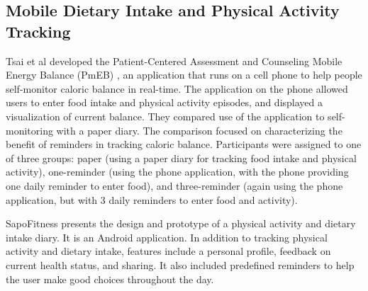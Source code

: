 \subsection{Mobile Dietary Intake and Physical Activity Tracking}
Tsai et al developed the Patient-Centered Assessment and Counseling Mobile Energy Balance (PmEB) \citep{tsai_usability_2007},  an application that runs on a cell phone to help people self-monitor caloric balance in real-time.  The application on the phone allowed users to enter food intake and physical activity episodes, and displayed a visualization of current balance. They compared use of the application to self-monitoring with a paper diary. The comparison focused on characterizing the benefit of reminders in tracking caloric balance. Participants were assigned to one of three groups: paper (using a paper diary for tracking food intake and physical activity), one-reminder (using the phone application, with the phone providing one daily reminder to enter food), and three-reminder (again using the phone application, but with 3 daily reminders to enter food and activity). 


SapoFitness \citep{silva_sapofitness:_2011} presents the design and prototype of a physical activity and dietary intake diary. It is an Android application. In addition to tracking physical activity and dietary intake, features include a personal profile, feedback on current health status, and sharing. It also included predefined reminders to help the user make good choices throughout the day. 



